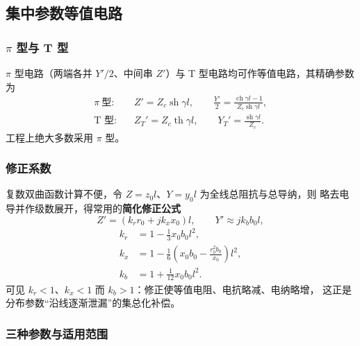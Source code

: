 \subsection{集中参数等值电路}

\subsubsection{$\pi$ 型与 T 型}

$\pi$ 型电路（两端各并 $Y'/2$、中间串 $Z'$）与 T 型电路均可作等值电路，其精确参数为
\begin{align}
  \pi\ \text{型}:&\quad Z'=Z_c\operatorname{sh}\gamma l,\qquad
     \frac{Y'}{2}=\frac{\operatorname{ch}\gamma l-1}{Z_c\operatorname{sh}\gamma l},\\
  \text{T 型}:&\quad Z_T'=Z_c\operatorname{th}\gamma l,\qquad Y_T'=\frac{\operatorname{sh}\gamma l}{Z_c}.
\end{align}
工程上绝大多数采用 $\pi$ 型。

\subsubsection{修正系数}

复数双曲函数计算不便，令 $Z=z_0l$、$Y=y_0l$ 为全线总阻抗与总导纳，则
略去电导并作级数展开，得常用的\textbf{简化修正公式}
\begin{equation}
  Z'=\left(k_r r_0+jk_x x_0\right)l,\qquad Y'\approx jk_b b_0 l,
\end{equation}
\begin{align}
  k_r&=1-\tfrac{1}{3}x_0b_0l^{2},\\
  k_x&=1-\tfrac{1}{6}\left(x_0b_0-\frac{r_0^{2}b_0}{x_0}\right)l^{2},\\
  k_b&=1+\tfrac{1}{12}x_0b_0l^{2}.
\end{align}
可见 $k_r<1$、$k_x<1$ 而 $k_b>1$：修正使等值电阻、电抗略减、电纳略增，
这正是分布参数“沿线逐渐泄漏”的集总化补偿。

\subsubsection{三种参数与适用范围}

